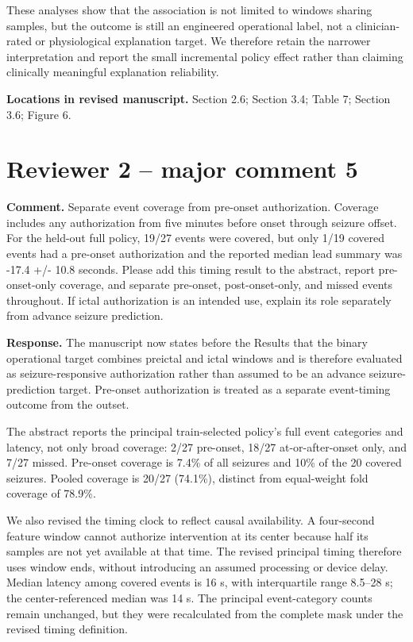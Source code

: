 \documentclass[11pt,a4paper]{article}
\begin{document}
These analyses show that the association is not limited to windows sharing samples, but the outcome is still an engineered operational label, not a clinician-rated or physiological explanation target. We therefore retain the narrower interpretation and report the small incremental policy effect rather than claiming clinically meaningful explanation reliability.

\textbf{Locations in revised manuscript.} Section 2.6; Section 3.4; Table 7; Section 3.6; Figure 6.

\section*{Reviewer 2 -- major comment 5}

\textbf{Comment.} Separate event coverage from pre-onset authorization. Coverage includes any authorization from five minutes before onset through seizure offset. For the held-out full policy, 19/27 events were covered, but only 1/19 covered events had a pre-onset authorization and the reported median lead summary was -17.4 +/- 10.8 seconds. Please add this timing result to the abstract, report pre-onset-only coverage, and separate pre-onset, post-onset-only, and missed events throughout. If ictal authorization is an intended use, explain its role separately from advance seizure prediction.

\textbf{Response.} The manuscript now states before the Results that the binary operational target combines preictal and ictal windows and is therefore evaluated as seizure-responsive authorization rather than assumed to be an advance seizure-prediction target. Pre-onset authorization is treated as a separate event-timing outcome from the outset.

The abstract reports the principal train-selected policy's full event categories and latency, not only broad coverage: 2/27 pre-onset, 18/27 at-or-after-onset only, and 7/27 missed. Pre-onset coverage is 7.4\% of all seizures and 10\% of the 20 covered seizures. Pooled coverage is 20/27 (74.1\%), distinct from equal-weight fold coverage of 78.9\%.

We also revised the timing clock to reflect causal availability. A four-second feature window cannot authorize intervention at its center because half its samples are not yet available at that time. The revised principal timing therefore uses window ends, without introducing an assumed processing or device delay. Median latency among covered events is 16 s, with interquartile range 8.5--28 s; the center-referenced median was 14 s. The principal event-category counts remain unchanged, but they were recalculated from the complete mask under the revised timing definition.
\end{document}
